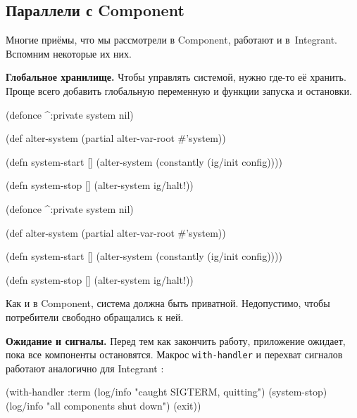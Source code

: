\subsection{Параллели с Component}

Многие приёмы, что мы рассмотрели в Component, работают и в~Integrant. Вспомним
некоторые их них.


\textbf{Глобальное хранилище.} Чтобы управлять системой, нужно где-то её
хранить. Проще всего добавить глобальную переменную и функции запуска и
остановки.

\ifnarrow

\begin{english}
  \begin{clojure}
(defonce ^:private system nil)

(def alter-system
  (partial alter-var-root #'system))

(defn system-start []
  (alter-system
    (constantly (ig/init config))))

(defn system-stop []
  (alter-system ig/halt!))
  \end{clojure}
\end{english}

\else

\begin{english}
  \begin{clojure}
(defonce ^:private system nil)

(def alter-system (partial alter-var-root #'system))

(defn system-start []
  (alter-system (constantly (ig/init config))))

(defn system-stop []
  (alter-system ig/halt!))
  \end{clojure}
\end{english}

\fi

Как и в Component, система должна быть приватной. Недопустимо, чтобы потребители
свободно обращались к ней.


\textbf{Ожидание и сигналы.} Перед тем как закончить работу, приложение ожидает,
пока все компоненты остановятся. Макрос \verb|with-handler| и перехват сигналов
работают аналогично для Integrant :

\begin{english}
  \begin{clojure}
(with-handler :term
  (log/info "caught SIGTERM, quitting")
  (system-stop)
  (log/info "all components shut down")
  (exit))
  \end{clojure}
\end{english}

